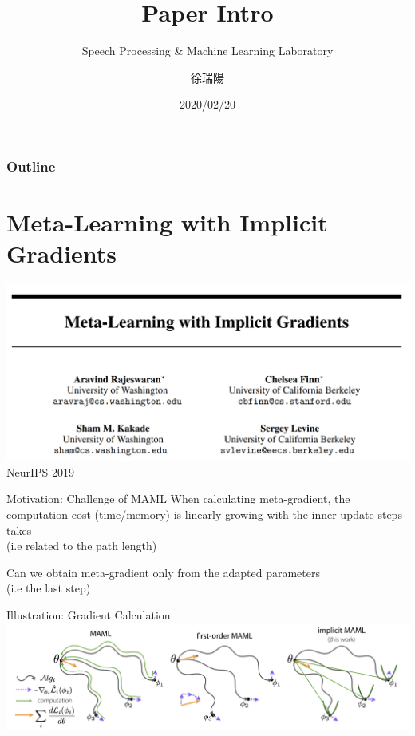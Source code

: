 \documentclass{beamer}
\title{Paper Intro}
\subtitle{\textcolor[rgb]{0.00,0.50,1.00}{{Speech Processing \& Machine Learning Laboratory}}}
\author{徐瑞陽}
\date{2020/02/20}
\begin{document}
\begin{frame}
\maketitle
\end{frame}



\begin{frame}
\frametitle{Outline}
\tableofcontents
\end{frame}

\section{Meta-Learning with Implicit Gradients}
\begin{frame}
  \includegraphics[width=\textwidth]{fig/iMAML-title.png}
  \center NeurIPS 2019
\end{frame}

\begin{frame}{Motivation: Challenge of MAML}
  When calculating meta-gradient, the computation cost (time/memory) is linearly growing with the inner update steps takes \\  (i.e related to the path length)

  \pause

  Can we obtain meta-gradient only from the adapted parameters\\ (i.e the last step)
\end{frame}

\begin{frame}[t]{Illustration: Gradient Calculation}
  \center \includegraphics[width=\textwidth]{fig/iMAML-illustraion.png}
\end{frame}
\end{document}
